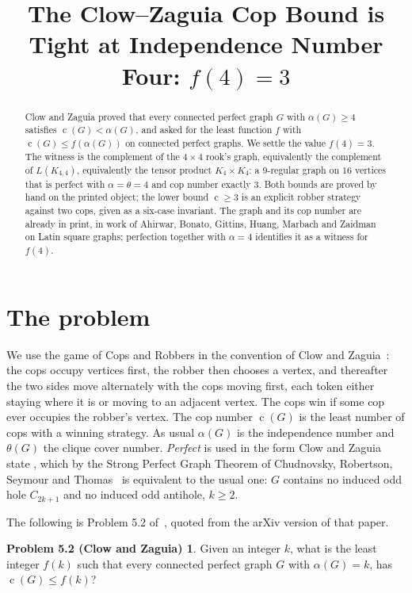 \documentclass[11pt]{amsart}
\title[The cop bound is tight at $\al=4$]
{The Clow--Zaguia Cop Bound is Tight at Independence Number Four: $f(4)=3$}
\date{}
\theoremstyle{definition}
\newtheorem*{problemCZ}{Problem 5.2 (Clow and Zaguia)}
\DeclareMathOperator{\cop}{c}
\newcommand{\al}{\alpha}
\newcommand{\theonum}{\theta}
\begin{document}
\begin{abstract}
Clow and Zaguia proved that every connected perfect graph $G$ with
$\al(G)\ge 4$ satisfies $\cop(G)<\al(G)$, and asked for the least function
$f$ with $\cop(G)\le f(\al(G))$ on connected perfect graphs. We settle the
value $f(4)=3$. The witness is the complement of the $4\times4$ rook's graph,
equivalently the complement of $L(K_{4,4})$, equivalently the tensor product
$K_4\times K_4$: a $9$-regular graph on $16$ vertices that is perfect with
$\al=\theonum=4$ and cop number exactly $3$. Both bounds are proved by hand on
the printed object; the lower bound $\cop\ge3$ is an explicit robber strategy
against two cops, given as a six-case invariant. The graph and its cop number
are already in print, in work of Ahirwar, Bonato, Gittins, Huang, Marbach and
Zaidman on Latin square graphs; perfection together with $\al=4$ identifies it
as a witness for $f(4)$.
\end{abstract}

\maketitle

\section{The problem}

We use the game of Cops and Robbers in the convention of Clow and
Zaguia~\cite{CZ}: the cops occupy vertices first, the robber then chooses a
vertex, and thereafter the two sides move alternately with the cops moving
first, each token either staying where it is or moving to an adjacent vertex.
The cops win if some cop ever occupies the robber's vertex. The cop number
$\cop(G)$ is the least number of cops with a winning strategy. As
usual $\al(G)$ is the independence number and $\theonum(G)$ the clique cover
number. \emph{Perfect} is used in the form Clow and Zaguia state
\cite[\S1]{CZ}, which by the Strong Perfect Graph Theorem of Chudnovsky,
Robertson, Seymour and Thomas~\cite{SPGT} is equivalent to the usual one: $G$
contains no induced odd hole $C_{2k+1}$ and no induced odd antihole,
$k\ge2$.

The following is Problem 5.2 of~\cite{CZ}, quoted from the arXiv version of
that paper.

\begin{problemCZ}
Given an integer $k$, what is the least integer $f(k)$ such that every
connected perfect graph $G$ with $\al(G)=k$, has $\cop(G)\le f(k)$?
\end{problemCZ}
\end{document}
